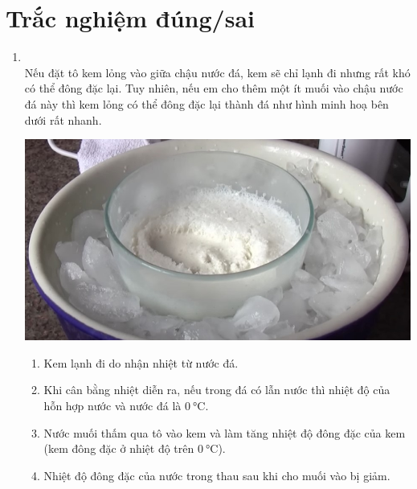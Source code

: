 \section{Trắc nghiệm đúng/sai}
\begin{enumerate}[label=\bfseries Câu \arabic*:, leftmargin=1.7cm]
	\item {}\\
	Nếu đặt tô kem lỏng vào giữa chậu nước đá, kem sẽ chỉ lạnh đi nhưng rất khó có thể đông đặc lại. Tuy nhiên, nếu em cho thêm một ít muối vào chậu nước đá này thì kem lỏng có thể đông đặc lại thành đá như hình minh hoạ bên dưới rất nhanh.
	\begin{center}
		\includegraphics[width=0.35\linewidth]{../figs/VN12-Y24-PH-SYL-006P-1}
	\end{center}
\begin{enumerate}[label=\alph*)]
	\item Kem lạnh đi do nhận nhiệt từ nước đá.
	\item Khi cân bằng nhiệt diễn ra, nếu trong đá có lẫn nước thì nhiệt độ của hỗn hợp nước và nước đá là $\SI{0}{\celsius}$.
	\item Nước muối thấm qua tô vào kem và làm tăng nhiệt độ đông đặc của kem (kem đông đặc ở nhiệt độ trên $\SI{0}{\celsius}$).
	\item Nhiệt độ đông đặc của nước trong thau sau khi cho muối vào bị giảm.
\end{enumerate}
\end{enumerate}
